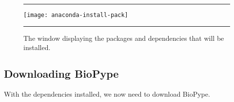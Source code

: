 \begin{enumerate}
\begin{figure}[hbtp]
    \begin{maxipage}
    \hrule
    \centering
    \texttt{[image: anaconda-install-pack]}
    \caption{The window displaying the packages and dependencies that will be installed.}
    \label{anaconda-install-pack}
    \hrule
    \end{maxipage}
\end{figure}
    
    \end{enumerate}


\subsection{Downloading BioPype}

With the dependencies installed, we now need to download BioPype. 

